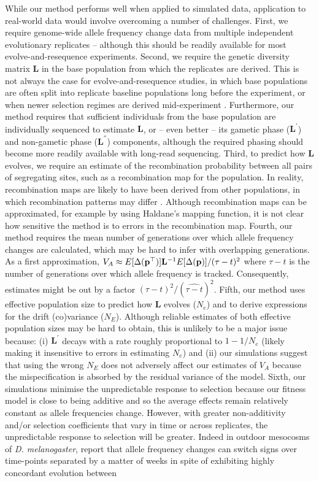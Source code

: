 \documentclass[12pt]{article}
\begin{document}
\begin{bibunit}
While our method performs well when applied to simulated data, application to real-world data would involve overcoming a number of challenges. First, we require genome-wide allele frequency change data from multiple independent evolutionary replicates -- although this should be readily available for most evolve-and-resequence experiments. Second, we require the genetic diversity matrix $\textbf{L}$ in the base population from which the replicates are derived. This is not always the case for evolve-and-resequence studies, in which base populations are often split into replicate baseline populations long before the experiment, or when newer selection regimes are derived mid-experiment \citep{burke2010genome,singh2015egg,gupta2016no, robinson2023evolution}. Furthermore, our method requires that sufficient individuals from the base population are individually sequenced  to estimate  $\textbf{L}$, or -- even better --  its gametic phase ($\textbf{L}^{'}$) and non-gametic phase ($\textbf{L}^{''}$) components, although the required phasing should become more readily available with long-read sequencing. Third, to predict how $\textbf{L}$ evolves, we require an estimate of the recombination probability between all pairs of segregating sites, such as a recombination map for the population. In reality, recombination maps are likely to have been derived from other populations, in which recombination patterns may differ \citep{johnston2024understanding}. Although recombination maps can be approximated, for example by using Haldane's mapping function, it is not clear how sensitive the method is to errors in the recombination map. Fourth, our method requires the mean number of generations over which allele frequency changes are calculated, which may be hard to infer with overlapping generations. As a first approximation, $V_A\approx E[\Delta({\bf p}^{\top})]{\bf L}^{-1}E[\Delta({\bf p})]/(\tau-t)^2$ where $\tau-t$ is the number of generations over which allele frequency is tracked. Consequently, estimates might be out by a factor $(\tau-t)^2/(\widehat{\tau-t})^2$. Fifth, our method uses effective population size to predict how $\textbf{L}$ evolves ($N_e$) and to derive expressions for the drift (co)variance ($N_E$). Although reliable estimates of both effective population sizes may be hard to obtain, this is unlikely to be a major issue because: (i) $\textbf{L}^{'}$ decays with a rate roughly proportional to $1 - 1/N_e$ (likely making it insensitive to errors in estimating  $N_e$)  and (ii) our simulations suggest that using the wrong $N_E$ does not adversely affect our estimates of $V_A$ because the mispecification is absorbed by the residual variance of the model. Sixth, our simulations minimise the unpredictable response to selection because our fitness model is close to being additive and so the average effects remain relatively constant as allele frequencies change. However, with greater non-additivity and/or selection coefficients that vary in time or across replicates, the unpredictable response to selection will be greater. Indeed in outdoor mesocosms of \emph{D. melanogaster}, \citet{Bitter.2024} report that allele frequency changes can switch signs over time-points separated by a matter of weeks in spite of exhibiting highly concordant evolution between 
\end{bibunit}
\end{document}
